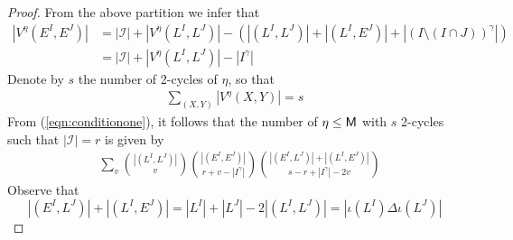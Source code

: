 \documentclass[10pt,a4paper]{amsart}
\begin{document}
\begin{proof}
	From the above partition we infer that
	\begin{align}
		\label{eqn:conditionone}
		 |V^{\eta}(E^I,E^J
        )|
		&= |\mathcal{I}| + |V^{\eta}(L^I,L^J)| \nonumber
		                                    -  (|(L^I,L^J)| + |(L^I,E^J)| + |(I\setminus (I\cap J))^\gamma|)                                        \nonumber \\
		                                   & = |\mathcal{I}| + |V^{\eta}(L^I,L^J)|-|I^\gamma|
	\end{align}
    Denote by $s$ the number of 2-cycles of $\eta$, so that
	\begin{align}
		\label{eqn:conditiontwo}
		\sum_{(X,Y)}|V^{\eta}(X,Y) | = s
	\end{align}
	From (\ref{eqn:conditionone}), it follows that the number of $\eta \leq {\sf M}$ with $s$ 2-cycles such that $|\mathcal{I}|=r$ is given by
	\begin{align}
	\label{eqn:CountingEta}
			 & \sum_v\binom{|(L^I,L^J)|}{v}
			 \binom{|(E^I, E^J)|}{r + v-|I^{\gamma}|} \binom{|(E^I,L^J)|+|(L^I,E^J)|}{s-r+|I^\gamma|-2v}
	\end{align}
    Observe that
    \begin{equation}
    \label{eqn:SymDiffEquality}
          |(E^I,L^J)| + |(L^I,E^J)| = |L^I|+ |L^J| -2|(L^I,L^J)|= |\iota(L^I)\Delta \iota (L^J)|
    \end{equation}
    

\end{proof}
\end{document}

